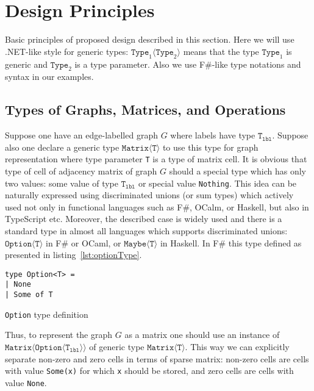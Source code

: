 \section{Design Principles}

Basic principles of proposed design described in this section.
Here we will use .NET-like style for generic types: $\texttt{Type}_1\langle\texttt{Type}_2\rangle$ means that the type $\texttt{Type}_1$ is generic and $\texttt{Type}_2$ is a type parameter.
Also we use F\#-like type notations and syntax in our examples.

\subsection{Types of Graphs, Matrices, and Operations}

Suppose one have an edge-labelled graph $G$ where labels have type $\texttt{T}_{\texttt{lbl}}$. 
Suppose also one declare a generic type $\texttt{Matrix} \langle \texttt{T} \rangle$ to use this type for graph representation where type parameter \texttt{T} is a type of matrix cell. 
It is obvious that type of cell of adjacency matrix of graph $G$ should a special type which has only two values: some value of type $\texttt{T}_{\texttt{lbl}}$ or special value \texttt{Nothing}.
This idea can be naturally expressed using discriminated unions (or sum types) which actively used not only in functional languages such as F\#, OCalm, or Haskell, but also in TypeScript etc. 
Moreover, the described case is widely used and there is a standard type in almost all languages which supports discriminated unions: $\texttt{Option} \langle \texttt{T} \rangle$ in F\# or OCaml, or $\texttt{Maybe} \langle \texttt{T} \rangle$ in Haskell. 
In F\# this type defined as presented in listing~\ref{lst:optionType}.

\begin{listing}[h]
\begin{verbatim}
type Option<T> =
| None
| Some of T
\end{verbatim}
\caption{\texttt{Option} type definition}
\label{lst:optionType}
\end{listing}


Thus, to represent the graph $G$ as a matrix one should use an instance of $\texttt{Matrix} \langle \texttt{Option}\langle \texttt{T}_{\texttt{lbl}} \rangle \rangle $  of generic type $\texttt{Matrix}\langle \texttt{T} \rangle$.
This way we can explicitly separate non-zero and zero cells in terms of sparse matrix: non-zero cells are cells with value \texttt{Some(x)} for which \texttt{x} should be stored, and zero cells are cells with value \texttt{None}.

